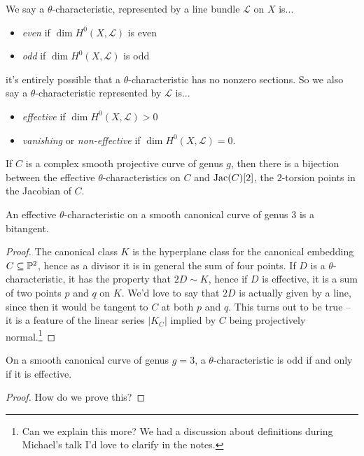 \documentclass[11pt]{amsart}
\begin{document}
\begin{definition} We say a $\theta$-characteristic, represented by a line bundle $\mathcal{L}$ on $X$ is...
\begin{itemize}
    \item \textit{even} if $\dim H^0(X,\mathcal{L})$ is even
    \item \textit{odd} if $\dim H^0(X,\mathcal{L})$ is odd
\end{itemize}
it's entirely possible that a $\theta$-characteristic has no nonzero sections. So we also say a $\theta$-characteristic represented by $\mathcal{L}$ is...
\begin{itemize}
    \item \textit{effective} if $\dim H^0(X,\mathcal{L})>0$
    \item \textit{vanishing} or \textit{non-effective} if $\dim H^0(X,\mathcal{L}) = 0$.
\end{itemize}
\end{definition}

\begin{remark} If $C$ is a complex smooth projective curve of genus $g$, then there is a bijection between the effective $\theta$-characteristics on $C$ and $\Jac(C)[2]$, the $2$-torsion points in the Jacobian of $C$.
\end{remark}

\begin{example} An effective $\theta$-characteristic on a smooth canonical curve of genus $3$ is a bitangent.
\end{example}
\begin{proof} The canonical class $K$ is the hyperplane class for the canonical embedding $C \subseteq \P^2$, hence as a divisor it is in general the sum of four points. If $D$ is a $\theta$-characteristic, it has the property that $2D \sim K$, hence if $D$ is effective, it is a sum of two points $p$ and $q$ on $K$. We'd love to say that $2D$ is actually given by a line, since then it would be tangent to $C$ at both $p$ and $q$. This turns out to be true -- it is a feature of the linear series $|K_C|$ implied by $C$ being projectively normal.\footnote{Can we explain this more? We had a discussion about definitions during Michael's talk I'd love to clarify in the notes.}
\end{proof}

\begin{proposition} On a smooth canonical curve of genus $g=3$, a $\theta$-characteristic is odd if and only if it is effective.
\end{proposition}
\begin{proof} How do we prove this?
\end{proof}
\end{document}
